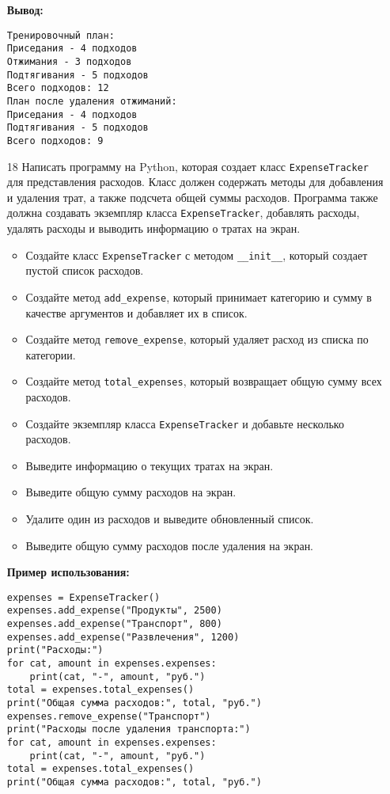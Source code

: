 \begin{enumerate}
\textbf{Вывод:}
\begin{verbatim}
Тренировочный план:
Приседания - 4 подходов
Отжимания - 3 подходов
Подтягивания - 5 подходов
Всего подходов: 12
План после удаления отжиманий:
Приседания - 4 подходов
Подтягивания - 5 подходов
Всего подходов: 9
\end{verbatim}

\item[18] Написать программу на Python, которая создает класс \texttt{ExpenseTracker} для представления расходов. Класс должен содержать методы для добавления и удаления трат, а также подсчета общей суммы расходов. Программа также должна создавать экземпляр класса \texttt{ExpenseTracker}, добавлять расходы, удалять расходы и выводить информацию о тратах на экран.

\begin{itemize}
    \item Создайте класс \texttt{ExpenseTracker} с методом \texttt{\_\_init\_\_}, который создает пустой список расходов.
    \item Создайте метод \texttt{add\_expense}, который принимает категорию и сумму в качестве аргументов и добавляет их в список.
    \item Создайте метод \texttt{remove\_expense}, который удаляет расход из списка по категории.
    \item Создайте метод \texttt{total\_expenses}, который возвращает общую сумму всех расходов.
    \item Создайте экземпляр класса \texttt{ExpenseTracker} и добавьте несколько расходов.
    \item Выведите информацию о текущих тратах на экран.
    \item Выведите общую сумму расходов на экран.
    \item Удалите один из расходов и выведите обновленный список.
    \item Выведите общую сумму расходов после удаления на экран.
\end{itemize}

\textbf{Пример использования:}

\begin{verbatim}
expenses = ExpenseTracker()
expenses.add_expense("Продукты", 2500)
expenses.add_expense("Транспорт", 800)
expenses.add_expense("Развлечения", 1200)
print("Расходы:")
for cat, amount in expenses.expenses:
    print(cat, "-", amount, "руб.")
total = expenses.total_expenses()
print("Общая сумма расходов:", total, "руб.")
expenses.remove_expense("Транспорт")
print("Расходы после удаления транспорта:")
for cat, amount in expenses.expenses:
    print(cat, "-", amount, "руб.")
total = expenses.total_expenses()
print("Общая сумма расходов:", total, "руб.")
\end{verbatim}


\end{enumerate}
